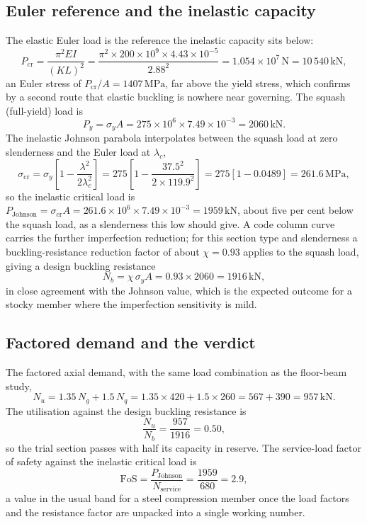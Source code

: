 \subsection{Euler reference and the inelastic capacity}

The elastic Euler load is the reference the inelastic capacity sits
below:
\[
P_{\text{cr}} = \frac{\pi^2 E I}{(KL)^2}
= \frac{\pi^2 \times 200 \times 10^9 \times 4.43 \times 10^{-5}}
{2.88^2}
= 1.054 \times 10^7\,\text{N} = 10\,540\,\text{kN},
\]
an Euler stress of $P_{\text{cr}}/A = 1407\,\text{MPa}$, far above the
yield stress, which confirms by a second route that elastic buckling is
nowhere near governing. The squash (full-yield) load is
\[
P_y = \sigma_y A = 275 \times 10^6 \times 7.49 \times 10^{-3}
= 2060\,\text{kN}.
\]
The inelastic Johnson parabola interpolates between the squash load at
zero slenderness and the Euler load at $\lambda_c$,
\[
\sigma_{\text{cr}} = \sigma_y\left[1 - \frac{\lambda^2}{2\lambda_c^2}
\right]
= 275\left[1 - \frac{37.5^2}{2 \times 119.9^2}\right]
= 275\left[1 - 0.0489\right] = 261.6\,\text{MPa},
\]
so the inelastic critical load is $P_{\text{Johnson}} =
\sigma_{\text{cr}} A = 261.6 \times 10^6 \times 7.49 \times 10^{-3} =
1959\,\text{kN}$, about five per cent below the squash load, as a
slenderness this low should give. A code column curve carries the
further imperfection reduction; for this section type and slenderness a
buckling-resistance reduction factor of about $\chi = 0.93$ applies to
the squash load, giving a design buckling resistance
\[
N_{b} = \chi\,\sigma_y A = 0.93 \times 2060 = 1916\,\text{kN},
\]
in close agreement with the Johnson value, which is the expected
outcome for a stocky member where the imperfection sensitivity is mild.

\subsection{Factored demand and the verdict}

The factored axial demand, with the same load combination as the
floor-beam study,
\[
N_u = 1.35\,N_g + 1.5\,N_q = 1.35 \times 420 + 1.5 \times 260
= 567 + 390 = 957\,\text{kN}.
\]
The utilisation against the design buckling resistance is
\[
\frac{N_u}{N_b} = \frac{957}{1916} = 0.50,
\]
so the trial section passes with half its capacity in reserve. The
service-load factor of safety against the inelastic critical load is
\[
\text{FoS} = \frac{P_{\text{Johnson}}}{N_{\text{service}}}
= \frac{1959}{680} = 2.9,
\]
a value in the usual band for a steel compression member once the load
factors and the resistance factor are unpacked into a single working
number.

